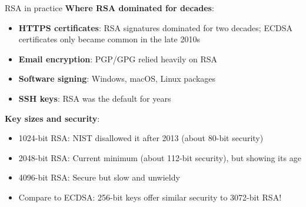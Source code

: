 \ifdefined\PRESENTATION\else\PassOptionsToClass{handout}{beamer}\fi\documentclass[aspectratio=169, lualatex]{beamer}
\begin{document}
\begin{frame}{RSA in practice}
	\textbf{Where RSA dominated for decades}:
	\begin{itemize}[<+->]
		\item \textbf{HTTPS certificates}: RSA signatures dominated for two decades; ECDSA certificates only became common in the late 2010s
		\item \textbf{Email encryption}: PGP/GPG relied heavily on RSA
		\item \textbf{Software signing}: Windows, macOS, Linux packages
		\item \textbf{SSH keys}: RSA was the default for years
	\end{itemize}
	\vspace{0.5cm}
	\textbf{Key sizes and security}:
	\begin{itemize}[<+->]
		\item 1024-bit RSA: NIST disallowed it after 2013 (about 80-bit security)
		\item 2048-bit RSA: Current minimum (about 112-bit security), but showing its age
		\item 4096-bit RSA: Secure but slow and unwieldy
		\item Compare to ECDSA: 256-bit keys offer similar security to 3072-bit RSA!
	\end{itemize}
\end{frame}
\end{document}
